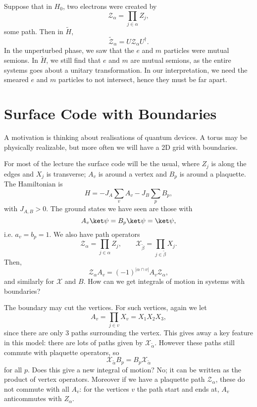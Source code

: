 \documentclass[12pt]{article}
\begin{document}
Suppose that in $H_0$, two electrons were created by
\[
\mathcal{Z}_\alpha = \prod_{j \in \alpha} Z_j,
\]
some path. Then in $\tilde H$,
\[
\tilde{\mathcal{Z}}_\alpha = U \mathcal{Z}_\alpha U^{\dagger}.
\]
In the unperturbed phase, we saw that the $e$ and $m$ particles were mutual semions. In $\tilde H$, we still find that $e$ and $m$ are mutual semions, as the entire systems goes about a unitary transformation. In our interpretation, we need the smeared $e$ and $m$ particles to not intersect, hence they must be far apart.


\newpage

\section{Surface Code with Boundaries}%
\label{sec:scwb}

A motivation is thinking about realisations of quantum devices. A torus may be physically realizable, but more often we will have a 2D grid with boundaries.

For most of the lecture the surface code will be the usual, where $Z_j$ is along the edges and $X_j$ is transverse; $A_v$ is around a vertex and $B_p$ is around a plaquette. The Hamiltonian is
\[
H = - J_A \sum_v A_v - J_B \sum_p B_p,
\]
with $J_{A, B} > 0$. The ground states we have seen are those with
\[
A_v \ket \psi = B_p \ket \psi = \ket \psi,
\]
i.e. $a_v = b_p = 1$. We also have path operators
\[
\mathcal{Z}_\alpha = \prod_{j \in \alpha} Z_j, \qquad \mathcal{X}_{\tilde \beta} = \prod_{j \in \tilde \beta} X_j.
\]
Then,
\[
\mathcal{Z}_\alpha A_v = (-1)^{|\alpha \cap v|} A_v \mathcal{Z}_\alpha,
\]
and similarly for $\mathcal{X}$ and $B$. How can we get integrals of motion in systems with boundaries?

The boundary may cut the vertices. For such vertices, again we let
\[
A_v = \prod_{j \in v} X_v = X_1 X_2 X_3,
\]
since there are only 3 paths surrounding the vertex. This gives away a key feature in this model: there are lots of paths given by $\mathcal{X}_{\tilde \alpha}$. However these paths still commute with plaquette operators, so
\[
\mathcal{X}_{\tilde \alpha} B_p = B_p \mathcal{X}_{\tilde \alpha}
\]
for all $p$. Does this give a new integral of motion? No; it can be written as the product of vertex operators. Moreover if we have a plaquette path $\mathcal{Z}_{\alpha}$, these do not commute with all $A_v$: for the vertices $v$ the path start and ends at, $A_v$ anticommutes with $Z_{\alpha}$.
\end{document}
